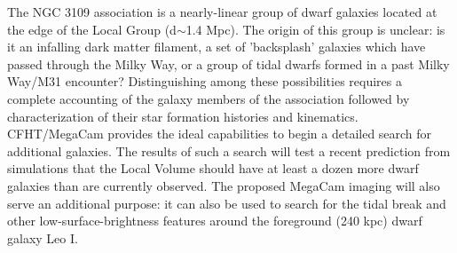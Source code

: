 The NGC 3109 association is a nearly-linear group of dwarf galaxies located at the edge of the Local Group (d$\sim$1.4 Mpc). The origin of this group is unclear: is it an infalling dark matter filament, a set of 'backsplash' galaxies which have passed through the Milky Way, or a group of tidal dwarfs formed in a past Milky Way/M31 encounter? Distinguishing among these possibilities requires a complete accounting of the  galaxy members of the association followed by characterization of their star formation histories and kinematics. CFHT/MegaCam provides the ideal capabilities to begin a detailed search for additional galaxies.
The results of such a search will test a recent prediction from simulations that the Local Volume should have at least a dozen more dwarf galaxies than
are currently observed. The proposed MegaCam imaging will also serve an additional purpose: it can also be used to search for the tidal break and other low-surface-brightness features around the  foreground (240 kpc) dwarf galaxy Leo I. 
